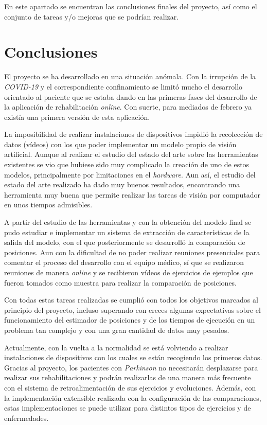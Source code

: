 
En este apartado se encuentran las conclusiones finales del proyecto, así como el conjunto de tareas y/o mejoras que se podrían realizar.

\section{Conclusiones}
El proyecto se ha desarrollado en una situación anómala. Con la irrupción de la \textit{COVID-19} y el correspondiente confinamiento se limitó mucho el desarrollo orientado al paciente que se estaba dando en las primeras fases del desarrollo de la aplicación de rehabilitación \textit{online}. Con suerte, para mediados de febrero ya existía una primera versión de esta aplicación.

La imposibilidad de realizar instalaciones de dispositivos impidió la recolección de datos (vídeos) con los que poder implementar un modelo propio de visión artificial. Aunque al realizar el estudio del estado del arte sobre las herramientas existentes se vio que hubiese sido muy complicado la creación de uno de estos modelos, principalmente por limitaciones en el \textit{hardware}. Aun así, el estudio del estado del arte realizado ha dado muy buenos resultados, encontrando una herramienta muy buena que permite realizar las tareas de visión por computador en unos tiempos admisibles.

A partir del estudio de las herramientas y con la obtención del modelo final se pudo estudiar e implementar un sistema de extracción de características de la salida del modelo, con el que posteriormente se desarrolló la comparación de posiciones. Aun con la dificultad de no poder realizar reuniones presenciales para comentar el proceso del desarrollo con el equipo médico, sí que se realizaron reuniones de manera \textit{online} y se recibieron vídeos de ejercicios de ejemplos que fueron tomados como muestra para realizar la comparación de posiciones. 

Con todas estas tareas realizadas se cumplió con todos los objetivos marcados al principio del proyecto, incluso superando con creces algunas expectativas sobre el funcionamiento del estimador de posiciones y de los tiempos de ejecución en un problema tan complejo y con una gran cantidad de datos muy pesados.

Actualmente, con la vuelta a la normalidad se está volviendo a realizar instalaciones de dispositivos con los cuales se están recogiendo los primeros datos. Gracias al proyecto, los pacientes con \textit{Parkinson} no necesitarán desplazarse para realizar sus rehabilitaciones y podrán realizarlas de una manera más frecuente con el sistema de retroalimentación de sus ejercicios y evoluciones. Además, con la implementación extensible realizada con la configuración de las comparaciones, estas implementaciones se puede utilizar para distintos tipos de ejercicios y de enfermedades. 

